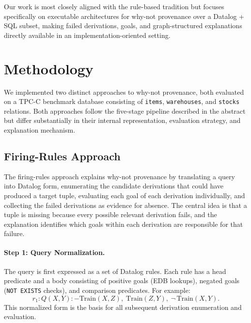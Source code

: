 \documentclass{llncs}
\begin{document}
Our work is most closely aligned with the rule-based tradition but
focuses specifically on executable architectures for why-not
provenance over a Datalog + SQL subset, making failed derivations,
goals, and graph-structured explanations directly available in an
implementation-oriented setting.

\section{Methodology}
\label{sec:methodology}

We implemented two distinct approaches to why-not provenance, both
evaluated on a TPC-C benchmark database consisting of
\texttt{items}, \texttt{warehouses}, and \texttt{stocks} relations.
Both approaches follow the five-stage pipeline described in the
abstract but differ substantially in their internal representation,
evaluation strategy, and explanation mechanism.

\subsection{Firing-Rules Approach}
\label{sec:firing-rules}

The firing-rules approach explains why-not provenance by translating a
query into Datalog form, enumerating the candidate derivations that
could have produced a target tuple, evaluating each goal of each
derivation individually, and collecting the failed derivations as
evidence for absence. The central idea is that a tuple is missing
because every possible relevant derivation fails, and the explanation
identifies which goals within each derivation are responsible for that
failure.

\paragraph{Step 1: Query Normalization.}
The query is first expressed as a set of Datalog rules. Each rule has a
head predicate and a body consisting of positive goals (EDB lookups),
negated goals (\texttt{NOT EXISTS} checks), and comparison predicates.
For example:
\begin{equation*}
  r_1\!: Q(X,Y) \mathbin{:-}
    \mathrm{Train}(X,Z),\;
    \mathrm{Train}(Z,Y),\;
    \neg\,\mathrm{Train}(X,Y).
\end{equation*}
This normalized form is the basis for all subsequent derivation
enumeration and evaluation.
\end{document}
